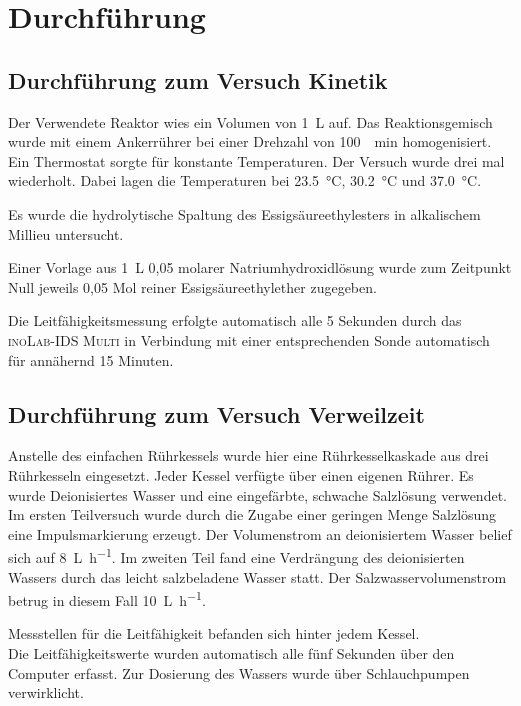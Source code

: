 \section{Durchführung}
\label{sec:durchfuerung}

\subsection{Durchführung zum Versuch Kinetik}
Der Verwendete Reaktor wies ein Volumen von \SI{1}{\liter} auf. Das Reaktionsgemisch wurde mit einem Ankerrührer bei einer Drehzahl von \SI{100}{\per\minute} homogenisiert. Ein Thermostat sorgte für konstante Temperaturen. 
Der Versuch wurde drei mal wiederholt. Dabei lagen die Temperaturen bei \SI{23,5}{\degreeCelsius}, \SI{30,2}{\degreeCelsius} und \SI{37,0}{\degreeCelsius}.

Es wurde die hydrolytische Spaltung des Essigsäureethylesters in alkalischem Millieu untersucht. 

Einer Vorlage aus \SI{1}{\liter} 0,05 molarer Natriumhydroxidlösung wurde zum Zeitpunkt Null jeweils 0,05 Mol reiner Essigsäureethylether zugegeben.   

Die Leitfähigkeitsmessung erfolgte automatisch alle 5 Sekunden durch das \textsc{inoLab-IDS Multi} in Verbindung mit einer entsprechenden Sonde automatisch für annähernd 15 Minuten.

\subsection{Durchführung zum Versuch Verweilzeit}

Anstelle des einfachen Rührkessels wurde hier eine Rührkesselkaskade aus drei Rührkesseln eingesetzt. Jeder Kessel verfügte über einen eigenen Rührer. Es wurde Deionisiertes Wasser und eine eingefärbte, schwache Salzlösung verwendet. 
Im ersten Teilversuch wurde durch die Zugabe einer geringen Menge Salzlösung eine Impulsmarkierung erzeugt.  
Der Volumenstrom an deionisiertem Wasser belief sich auf \SI{8}{\liter\per\hour}.\linebreak
Im zweiten Teil fand eine Verdrängung des deionisierten Wassers durch das leicht salzbeladene Wasser statt. Der Salzwasservolumenstrom betrug in diesem Fall \SI{10}{\liter\per\hour}.

Messstellen für die Leitfähigkeit befanden sich hinter jedem Kessel. \\Die Leitfähigkeitswerte wurden automatisch alle fünf Sekunden über den Computer erfasst.
Zur Dosierung des Wassers wurde über Schlauchpumpen verwirklicht.
